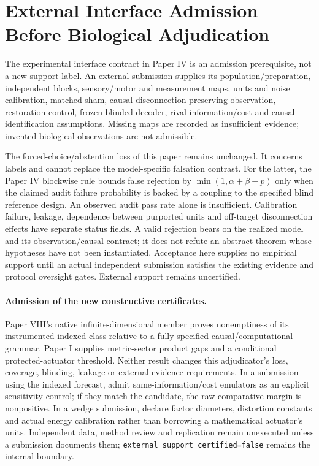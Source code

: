 \documentclass[11pt,a4paper]{article}
\begin{document}
\section{External Interface Admission Before Biological Adjudication}
The experimental interface contract in Paper IV is an admission prerequisite, not a new support label. An external submission supplies its population/preparation, independent blocks, sensory/motor and measurement maps, units and noise calibration, matched sham, causal disconnection preserving observation, restoration control, frozen blinded decoder, rival information/cost and causal identification assumptions. Missing maps are recorded as insufficient evidence; invented biological observations are not admissible.

The forced-choice/abstention loss of this paper remains unchanged. It concerns labels and cannot replace the model-specific falsation contrast. For the latter, the Paper IV blockwise rule bounds false rejection by $\min(1,\alpha+\beta+p)$ only when the claimed audit failure probability is backed by a coupling to the specified blind reference design. An observed audit pass rate alone is insufficient. Calibration failure, leakage, dependence between purported units and off-target disconnection effects have separate status fields. A valid rejection bears on the realized model and its observation/causal contract; it does not refute an abstract theorem whose hypotheses have not been instantiated. Acceptance here supplies no empirical support until an actual independent submission satisfies the existing evidence and protocol oversight gates. External support remains uncertified.

\paragraph{Admission of the new constructive certificates.}
Paper VIII's native infinite-dimensional member proves nonemptiness of its
instrumented indexed class relative to a fully specified causal/computational
grammar. Paper I supplies metric-sector product gaps and a conditional
protected-actuator threshold. Neither result changes this adjudicator's
loss, coverage, blinding, leakage or external-evidence requirements. In a
submission using the indexed forecast, admit same-information/cost emulators
as an explicit sensitivity control; if they match the candidate, the raw
comparative margin is nonpositive. In a wedge submission, declare factor
diameters, distortion constants and actual energy calibration rather than
borrowing a mathematical actuator's units. Independent data, method review
and replication remain unexecuted unless a submission documents them;
\texttt{external\_support\_certified=false} remains the internal boundary.
\end{document}
